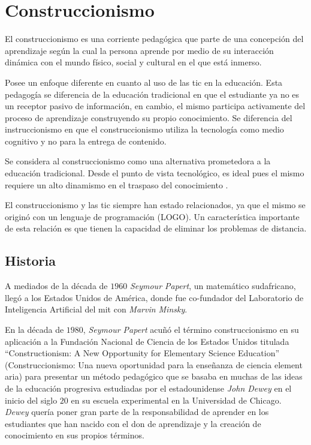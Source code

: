 \section{Construccionismo}
\label{sec:tics_CONSTRUCCIONISMO}

El construccionismo es una corriente pedagógica que parte de una concepción del
aprendizaje según la cual la persona aprende por medio de su interacción
dinámica con el mundo físico, social y cultural en el que está
inmerso\cite{valdivia:sg}.

Posee un enfoque diferente en cuanto al uso de las \Gls{tic} en la educación.
Esta pedagogía se diferencia de la educación tradicional en que el estudiante ya
no es un receptor pasivo de información, en cambio, el mismo participa
activamente del proceso de aprendizaje construyendo su propio conocimiento. Se
diferencia del instruccionismo en que el construccionismo utiliza la tecnología
como medio cognitivo y no para la entrega de contenido.

Se considera al construccionismo como una alternativa prometedora a la educación
tradicional. Desde el punto de vista tecnológico, es ideal pues el mismo
requiere un alto dinamismo en el traspaso del conocimiento
\cite{sasha:construtivism}. 

El construccionismo y las \Gls{tic} siempre han estado relacionados, ya que el
mismo se originó con un lenguaje de programación (LOGO)\cite{ict:ttc}. Un
característica importante de esta relación es que tienen la capacidad de
eliminar los problemas de distancia\cite{mariluz:seiousgames}.


\subsection{Historia}

A mediados de la década de $1960$ \textit{Seymour Papert}, un matemático
sudafricano, llegó a los Estados Unidos de América, donde fue co-fundador del
Laboratorio de Inteligencia Artificial del \Gls{mit} con \textit{Marvin
    Minsky}\cite{logo:sg}. 


En la década de $1980$, \textit{Seymour Papert} acuñó el término
construccionismo en su aplicación a la Fundación Nacional de Ciencia de los
Estados Unidos titulada \enquote{Constructionism: A New Opportunity for
    Elementary Science Education} (Construccionismo: Una nueva oportunidad para
la enseñanza de ciencia element aria) para presentar un método pedagógico que se
basaba en muchas de las ideas de la educación progresiva estudiadas por el
estadounidense \textit{John Dewey} en el inicio del siglo $20$ en su escuela experimental
en la Universidad de Chicago. \textit{Dewey} quería poner gran parte de la
responsabilidad de aprender en los estudiantes que han nacido con el don de
aprendizaje y la creación de conocimiento en sus propios
términos\cite{historia:2014}.

